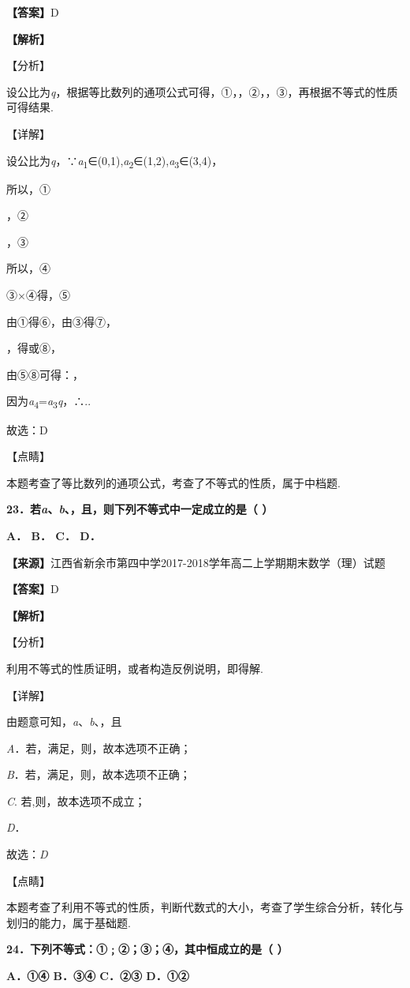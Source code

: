 \textbf{【答案】}D

\textbf{【解析】}

【分析】

设公比为\emph{q}，根据等比数列的通项公式可得，①，，②，，③，再根据不等式的性质可得结果.

【详解】

设公比为\emph{q}，∵\emph{a}\textsubscript{1}∈(0,1),\emph{a}\textsubscript{2}∈(1,2),\emph{a}\textsubscript{3}∈(3,4)，

所以，①

，②

，③

所以，④

③×④得，⑤

由①得⑥，由③得⑦，

，得或⑧，

由⑤⑧可得：，

因为\emph{a}\textsubscript{4}=\emph{a}\textsubscript{3}\emph{q}，∴..

故选：D

【点睛】

本题考查了等比数列的通项公式，考查了不等式的性质，属于中档题.

\textbf{23．若\emph{a}、\emph{b}、，且，则下列不等式中一定成立的是（ ）}

\textbf{A． B． C． D．}

\textbf{【来源】}江西省新余市第四中学2017-2018学年高二上学期期末数学（理）试题

\textbf{【答案】}D

\textbf{【解析】}

【分析】

利用不等式的性质证明，或者构造反例说明，即得解.

【详解】

由题意可知，\emph{a}、\emph{b}、，且

\emph{A}．若，满足，则，故本选项不正确；

\emph{B}．若，满足，则，故本选项不正确；

\emph{C}. 若,则，故本选项不成立；

\emph{D}．

故选：\emph{D}

【点睛】

本题考查了利用不等式的性质，判断代数式的大小，考查了学生综合分析，转化与划归的能力，属于基础题.

\textbf{24．下列不等式：①﹔②；③；④，其中恒成立的是（ ）}

\textbf{A．①④ B．③④ C．②③ D．①②}

